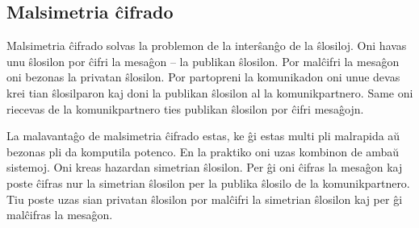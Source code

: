 \documentclass[utf8]{scrartcl}
\makeatletter
\renewenvironment{figure}[1][]{%
  \ifthenelse{\equal{#1}{}}{%
    \@float{figure}%
  }{%
    \@float{figure}[#1]%
  }%
  \centering%
}{%
\end@float\ignorespaces\ignorespacesafterend%
}
\makeatother
\begin{document}
\subsection{Malsimetria ĉifrado}

Malsimetria ĉifrado solvas la problemon de la interŝanĝo de la ŝlosiloj. Oni
havas unu ŝlosilon por ĉifri la mesaĝon – la publikan ŝlosilon. Por malĉifri la
mesaĝon oni bezonas la privatan ŝlosilon.  Por partopreni la komunikadon oni
unue devas krei tian ŝlosilparon kaj doni la publikan ŝlosilon al la
komunikpartnero.  Same oni riecevas de la komunikpartnero ties publikan
ŝlosilon por ĉifri mesaĝojn.

La malavantaĝo de malsimetria ĉifrado estas, ke ĝi estas multi pli malrapida aŭ
bezonas pli da komputila potenco.  En la praktiko oni uzas kombinon de ambaŭ
sistemoj. Oni kreas hazardan simetrian ŝlosilon. Per ĝi oni ĉifras la mesaĝon
kaj poste ĉifras nur la simetrian ŝlosilon per la publika ŝlosilo de la
komunikpartnero.  Tiu poste uzas sian privatan ŝlosilon por malĉifri la
simetrian ŝlosilon kaj per ĝi malĉifras la mesaĝon.
%
\begin{figure}
  \caption{La principo de malsimetria ĉifrado}
\end{figure}
\end{document}
